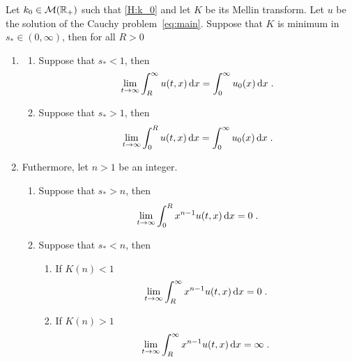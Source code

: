         \begin{proposition}
            \label{p:locationmoment} 
            Let $k_0 \in \mathcal{M}(\mathbb{R}_+)$ such that \eqref{H:k_0} and let $K$ be its Mellin transform. Let $u$ be the solution of the Cauchy problem~\eqref{eq:main}. 
            Suppose that $K$ is minimum in $s_* \in (0, \infty)$, then for all $R > 0$
            \begin{enumerate}
                \item 
                \begin{enumerate}
                    \item Suppose that $s_* < 1$, then
                        \begin{align*}
                        \lim_{t\to \infty} \int_R^\infty u(t,x) \,\mathrm{d} x = \int_0^\infty u_0(x) \,\mathrm{d} x
                        \; .
                        \end{align*}
                    \item Suppose that $s_* > 1$, then
                        \begin{align*}
                        \lim_{t\to \infty} \int_0^R u(t,x) \,\mathrm{d} x = \int_0^\infty u_0(x) \,\mathrm{d} x
                        \; .
                        \end{align*}
                \end{enumerate}
                \item Futhermore, let $n > 1$ be an integer.
                    \begin{enumerate}
                    \item Suppose that $s_* > n$, then 
                        \begin{align*}
                        \lim_{t\to \infty} \int_0^R x^{n-1} u(t,x) \,\mathrm{d} x = 0
                        \; .
                        \end{align*}
                    \item Suppose that $s_* < n$, then 
                    \begin{enumerate}
                    \item If $K(n) < 1$
                        \begin{align*}
                        \lim_{t\to \infty} \int_R^{\infty} x^{n-1} u(t,x) \,\mathrm{d} x = 0
                        \; .
                        \end{align*}
                    \item If $K(n) > 1$
                        \begin{align*}
                        \lim_{t\to \infty} \int_R^{\infty} x^{n-1} u(t,x) \,\mathrm{d} x = \infty
                        \; .
                        \end{align*}
                \end{enumerate}
            \end{enumerate}
        \end{enumerate}
        \end{proposition}
        
